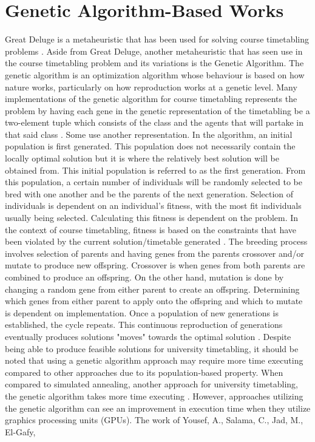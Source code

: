 \section{Genetic Algorithm-Based Works}
Great Deluge is a metaheuristic \cite{intro-gd-dueck} that has been used for solving course timetabling problems \cite{gd-burke}\cite{nlgd-landa-silva}\cite{nlgdrl-obit}. Aside from Great Deluge, another metaheuristic that has seen use in the course timetabling problem and its variations is the Genetic Algorithm. The genetic algorithm is an optimization algorithm whose behaviour is based on how nature works, particularly on how reproduction works at a genetic level. Many implementations of the genetic algorithm for course timetabling represents the problem by having each gene in the genetic representation of the timetabling be a two-element tuple which consists of the class and the agents that will partake in that said class \cite{alves-novel-recursive}\cite{raghavjee-ga-south-africa}\cite{supachate-noval-approach-ga-thai}. Some use another representation. In the algorithm, an initial population is first generated. This population does not necessarily contain the locally optimal solution but it is where the relatively best solution will be obtained from. This initial population is referred to as the first generation. From this population, a certain number of individuals will be randomly selected to be bred with one another and be the parents of the next generation. Selection of individuals is dependent on an individual's fitness, with the most fit individuals usually being selected. Calculating this fitness is dependent on the problem. In the context of course timetabling, fitness is based on the constraints that have been violated by the current solution/timetable generated \cite{alves-novel-recursive}\cite{raghavjee-ga-south-africa}\cite{johan-ga-sa-comparison}\cite{yik-ga-timetabling}\cite{supachate-noval-approach-ga-thai}\cite{wutthipong-performance-study-genetic-operators}\cite{sanjay-an-application-of-ga}. The breeding process involves selection of parents and having genes from the parents crossover and/or mutate to produce new offspring. Crossover is when genes from both parents are combined to produce an offspring. On the other hand, mutation is done by changing a random gene from either parent to create an offspring. Determining which genes from either parent to apply onto the offspring and which to mutate is dependent on implementation. Once a population of new generations is established, the cycle repeats. This continuous reproduction of generations eventually produces solutions "moves" towards the optimal solution \cite{what-is-ga}. Despite being able to produce feasible solutions for university timetabling, it should be noted that using a genetic algorithm approach may require more time executing compared to other approaches due to its population-based property. When compared to simulated annealing, another approach for university timetabling, the genetic algorithm takes more time executing \cite{johan-ga-sa-comparison}. However, approaches utilizing the genetic algorithm can see an improvement in execution time when they utilize graphics processing units (GPUs). The work of Yousef, A., Salama, C., Jad, M., El-Gafy, 